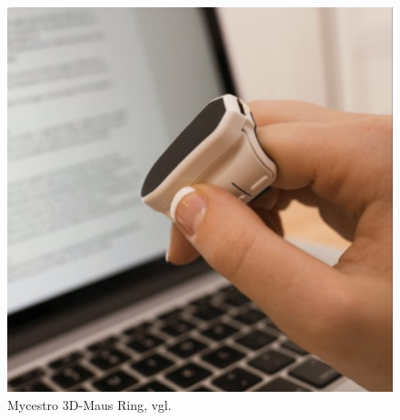 \begin{figure}[h]
\captionsetup{width=.7\linewidth}
\includegraphics[scale=0.4]{Bilder/Hauptteil/mycestro}
\centering
\caption{Mycestro 3D-Maus Ring, vgl.~\citep{mycestro}}
\label{fig:mycestro}
\end{figure}

